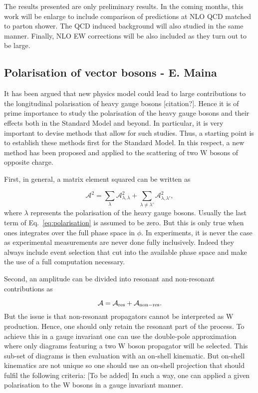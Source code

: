 The results presented are only preliminary results.
In the coming months, this work will be enlarge to include comparison of predictions at NLO QCD matched to parton shower.
The QCD induced background will also studied in the same manner.
Finally, NLO EW corrections will be also included as they turn out to be large.

\subsection{Polarisation of vector bosons - E. Maina}

It has been argued that new physics model could lead to large contributions to the longitudinal polarisation of heavy gauge bosons [citation?].
Hence it is of prime importance to study the polarisation of the heavy gauge bosons and their effects both in the Standard Model and beyond.
In particular, it is very important to devise methods that allow for such studies.
Thus, a starting point is to establish these methods first for the Standard Model.
In this respect, a new method has been proposed and applied to the scattering of two W bosons of opposite charge.

First, in general, a matrix element squared can be written as

\begin{equation}
\label{eq:polarisation}
 \mathcal{A}^2 = \sum_{\lambda} \mathcal{A}^2_{\lambda, \lambda} + \sum_{\lambda \neq \lambda'} \mathcal{A}^2_{\lambda, \lambda'}, 
\end{equation}
%
where $\lambda$ represents the polarisation of the heavy gauge bosons.
Usually the last term of Eq.~\eqref{eq:polarisation} is assumed to be zero.
But this is only true when ones integrates over the full phase space in $\phi$.
In experiments, it is never the case as experimental measurements are never done fully inclusively.
Indeed they always include event selection that cut into the available phase space and make the use of a full computation necessary.

Second, an amplitude can be divided into resonant and non-resonant contributions as

\begin{equation}
\mathcal{A} = \mathcal{A}_{\rm res} + \mathcal{A}_{\rm non-res} .
\end{equation}
%
But the issue is that non-resonant propagators cannot be interpreted as W production.
Hence, one should only retain the resonant part of the process.
To achieve this in a gauge invariant one can use the double-pole approximation where only diagrams featuring a two W boson propagator will be selected.
This sub-set of diagrams is then evaluation with an on-shell kinematic.
But on-shell kinematics are not unique so one should use an on-shell projection that should fulfil the following criteria:
[To be added]
In such a way, one can applied a given polarisation to the W bosons in a gauge invariant manner.

